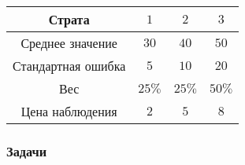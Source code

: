 \begin{enumerate}
	\begin{center}
		\begin{tabular}{cccc}
			\toprule
			Страта & $1$ & $2$ & $3$  \\
			\midrule
			Среднее значение & $30$ & $40$ & $50$ \\
			Стандартная ошибка  & $5$ & $10$ & $20$ \\
			Вес & $25\%$ & $25\%$ & $50\%$ \\
			Цена наблюдения & $2$ & $5$ & $8$ \\
			\bottomrule
		\end{tabular}
	\end{center}
	\end{enumerate}



\subsubsection{Задачи}

